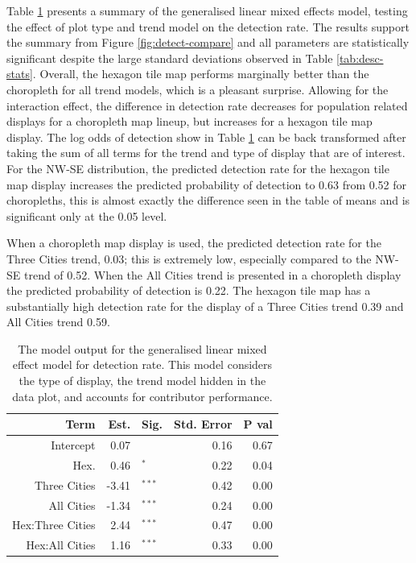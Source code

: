 \documentclass{monashthesis}
\begin{document}
Table \ref{tab:detect-glmer1} presents a summary of the generalised linear mixed effects model, testing the effect of plot type and trend model on the detection rate. The results support the summary from Figure \ref{fig:detect-compare} and all parameters are statistically significant despite the large standard deviations observed in Table \ref{tab:desc-stats}. Overall, the hexagon tile map performs marginally better than the choropleth for all trend models, which is a pleasant surprise. Allowing for the interaction effect, the difference in detection rate decreases for population related displays for a choropleth map lineup, but increases for a hexagon tile map display.
The log odds of detection show in Table \ref{tab:detect-glmer1} can be back transformed after taking the sum of all terms for the trend and type of display that are of interest.
For the NW-SE distribution, the predicted detection rate for the hexagon tile map display increases the predicted probability of detection to 0.63 from 0.52 for choropleths, this is almost exactly the difference seen in the table of means and is significant only at the 0.05 level.

When a choropleth map display is used, the predicted detection rate for the Three Cities trend, 0.03; this is extremely low, especially compared to the NW-SE trend of 0.52.
When the All Cities trend is presented in a choropleth display the predicted probability of detection is 0.22.
The hexagon tile map has a substantially high detection rate for the display of a Three Cities trend 0.39 and All Cities trend 0.59.

\begin{table}[!h]

\caption{\label{tab:detect-glmer1}The model output for the generalised linear mixed effect model for detection rate. This model considers the type of display, the trend model hidden in the data plot, and accounts for contributor performance.}
\centering
\begin{tabular}[t]{rrlrr}
\toprule
Term & Est. & Sig. & Std. Error & P val\\
\midrule
Intercept & 0.07 & $^{ }$ & 0.16 & 0.67\\
Hex. & 0.46 & $^{*}$ & 0.22 & 0.04\\
\addlinespace
Three Cities & -3.41 & $^{***}$ & 0.42 & 0.00\\
All Cities & -1.34 & $^{***}$ & 0.24 & 0.00\\
\addlinespace
Hex:Three Cities & 2.44 & $^{***}$ & 0.47 & 0.00\\
Hex:All Cities & 1.16 & $^{***}$ & 0.33 & 0.00\\
\bottomrule
\end{tabular}
\end{table}
\end{document}
